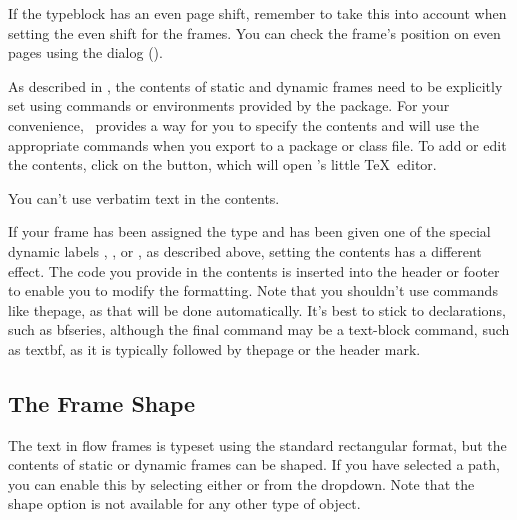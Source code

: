 \begin{warning}
If the \gls{typeblock} has an even page shift, remember to take this into
account when setting the even shift for the frames. You can check
the frame's position on even pages using the 
dialog ().
\end{warning}


As described in , the contents of
static and dynamic frames need to be explicitly set using commands
or environments provided by the  package. For your
convenience, \FlowframTk\ provides a way for you to specify the
contents and will use the appropriate commands when you export to a
package or class file.
To add or edit the contents, click on the
 button, which will open
\FlowframTk's little \TeX\ editor.

\begin{important}
You can't use verbatim text in the contents.
\end{important}

If your frame has been assigned the
 type and has been given one of
the special dynamic labels , ,
 or , as described above,
setting the contents has a different effect. The code you provide in
the contents is inserted into the header or footer to enable you to
modify the formatting. Note that you shouldn't use commands like
\gls{thepage}, as that will be done automatically. It's best to
stick to declarations, such as \gls{bfseries}, although the
final command may be a text-block command, such as \gls{textbf},
as it is typically followed by \gls{thepage} or the header mark.

\subsection{The Frame Shape}\label{sec:frameshape}

The text in flow frames is typeset using the standard rectangular
format, but the contents of static or dynamic frames can be shaped. If you
have selected a \gls{path}, you can enable
this by selecting either 
or  from the
 \gls*{dropdown}. Note that the
shape option is not available for any other type of \gls{object}.
  
